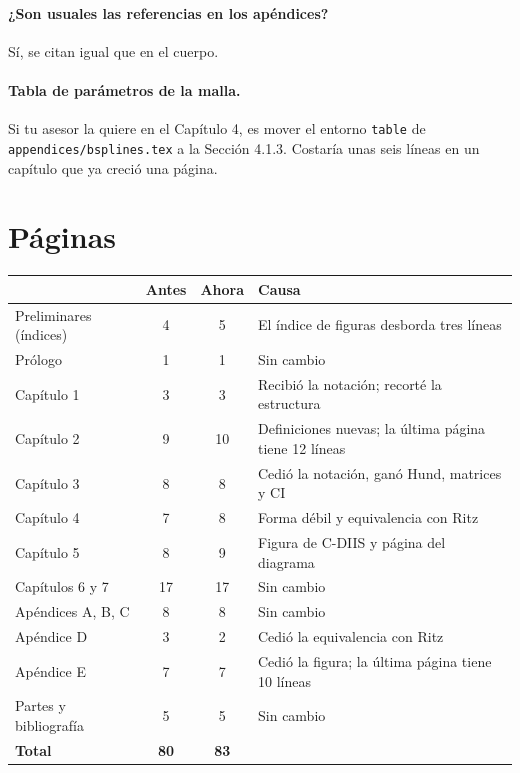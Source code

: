 \documentclass[11pt,a4paper]{article}
\newcommand{\arch}[1]{\texttt{\small #1}}
\begin{document}
\paragraph{¿Son usuales las referencias en los apéndices?} Sí, se citan igual que en el cuerpo.

\paragraph{Tabla de parámetros de la malla.} Si tu asesor la quiere en el Capítulo 4, es mover el
entorno \texttt{table} de \arch{appendices/bsplines.tex} a la Sección 4.1.3. Costaría unas seis
líneas en un capítulo que ya creció una página.

\section{Páginas}
\label{sec:paginas}

\begin{center}
\begin{tabular}{lccl}
\toprule
 & \textbf{Antes} & \textbf{Ahora} & \textbf{Causa}\\
\midrule
Preliminares (índices) & 4 & 5 & El índice de figuras desborda tres líneas\\
Prólogo & 1 & 1 & Sin cambio\\
Capítulo 1 & 3 & 3 & Recibió la notación; recorté la estructura\\
Capítulo 2 & 9 & 10 & Definiciones nuevas; la última página tiene 12 líneas\\
Capítulo 3 & 8 & 8 & Cedió la notación, ganó Hund, matrices y CI\\
Capítulo 4 & 7 & 8 & Forma débil y equivalencia con Ritz\\
Capítulo 5 & 8 & 9 & Figura de C-DIIS y página del diagrama\\
Capítulos 6 y 7 & 17 & 17 & Sin cambio\\
Apéndices A, B, C & 8 & 8 & Sin cambio\\
Apéndice D & 3 & 2 & Cedió la equivalencia con Ritz\\
Apéndice E & 7 & 7 & Cedió la figura; la última página tiene 10 líneas\\
Partes y bibliografía & 5 & 5 & Sin cambio\\
\midrule
\textbf{Total} & \textbf{80} & \textbf{83} & \\
\bottomrule
\end{tabular}
\end{center}
\end{document}
